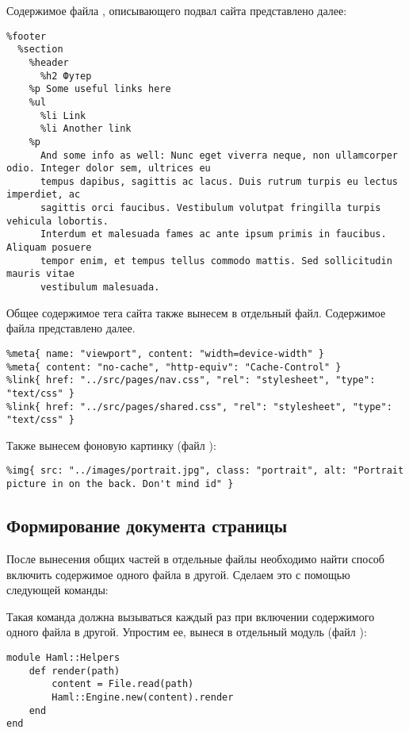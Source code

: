 \documentclass[a4paper,14pt]{extarticle}
\begin{document}
Содержимое файла , описывающего подвал сайта представлено далее:
\begin{lstlisting}
%footer
  %section
    %header
      %h2 Футер
    %p Some useful links here
    %ul
      %li Link
      %li Another link
    %p
      And some info as well: Nunc eget viverra neque, non ullamcorper odio. Integer dolor sem, ultrices eu
      tempus dapibus, sagittis ac lacus. Duis rutrum turpis eu lectus imperdiet, ac
      sagittis orci faucibus. Vestibulum volutpat fringilla turpis vehicula lobortis.
      Interdum et malesuada fames ac ante ipsum primis in faucibus. Aliquam posuere
      tempor enim, et tempus tellus commodo mattis. Sed sollicitudin mauris vitae
      vestibulum malesuada.
\end{lstlisting}

Общее содержимое тега  сайта также вынесем в отдельный файл. Содержимое файла 
представлено далее.
\begin{lstlisting}
%meta{ name: "viewport", content: "width=device-width" }
%meta{ content: "no-cache", "http-equiv": "Cache-Control" }
%link{ href: "../src/pages/nav.css", "rel": "stylesheet", "type": "text/css" }
%link{ href: "../src/pages/shared.css", "rel": "stylesheet", "type": "text/css" }
\end{lstlisting}

Также вынесем фоновую картинку (файл ):
\begin{lstlisting}
%img{ src: "../images/portrait.jpg", class: "portrait", alt: "Portrait picture in on the back. Don't mind id" }
\end{lstlisting}

\subsection{Формирование  документа страницы}
После вынесения общих частей в отдельные файлы необходимо найти способ включить
содержимое одного  файла в другой. Сделаем это с помощью следующей
команды:


Такая команда должна вызываться каждый раз при включении содержимого одного файла в другой.
Упростим ее, вынеся в отдельный модуль (файл ):

\begin{lstlisting}
module Haml::Helpers
    def render(path)
        content = File.read(path)
        Haml::Engine.new(content).render
    end
end
\end{lstlisting}
\end{document}
